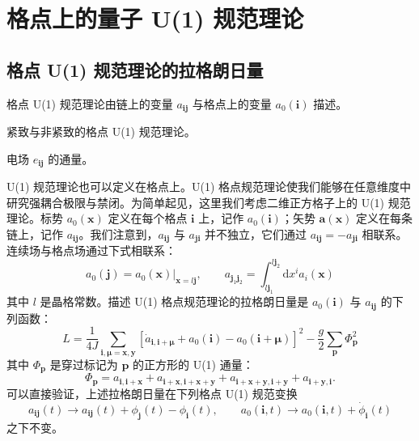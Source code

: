 \section{格点上的量子 U(1) 规范理论}

\subsection{格点 U(1) 规范理论的拉格朗日量}

\begin{keypoints}
\item 格点 U(1) 规范理论由链上的变量 $a_{\pmb{i}\pmb{j}}$ 与格点上的变量 $a_{0}(\pmb{i})$ 描述。
\item 紧致与非紧致的格点 U(1) 规范理论。
\item 电场 $e_{\pmb{i}\pmb{j}}$ 的通量。
\end{keypoints}

U(1) 规范理论也可以定义在格点上。U(1) 格点规范理论使我们能够在任意维度中研究强耦合极限与禁闭。为简单起见，这里我们考虑二维正方格子上的 U(1) 规范理论。标势 $a_{0}(\pmb{x})$ 定义在每个格点 $\pmb{i}$ 上，记作 $a_{0}(\pmb{i})$；矢势 $\pmb{a}(\pmb{x})$ 定义在每条链上，记作 $a_{\pmb{i}\pmb{j}}$。我们注意到，$a_{\pmb{i}\pmb{j}}$ 与 $a_{\pmb{j}\pmb{i}}$ 并不独立，它们通过 $a_{\pmb{i}\pmb{j}}=-a_{\pmb{j}\pmb{i}}$ 相联系。连续场与格点场通过下式相联系：
\begin{equation*}
a_{0}(\pmb{j})=a_{0}(\pmb{x})|_{\pmb{x}=l\pmb{j}}, \qquad a_{\pmb{j}_{1}\pmb{j}_{2}}=\int_{l\pmb{j}_{1}}^{l\pmb{j}_{2}}\mathrm{d}x^{i}a_{i}(\pmb{x}) \tag{6.4.1}
\end{equation*}
其中 $l$ 是晶格常数。描述 U(1) 格点规范理论的拉格朗日量是 $a_{0}(\pmb{i})$ 与 $a_{\pmb{i}\pmb{j}}$ 的下列函数：
\begin{equation*}
L=\frac{1}{4J}\sum_{\pmb{i},\pmb{\mu}=\pmb{x},\pmb{y}}\left[\dot{a}_{\pmb{i},\pmb{i}+\pmb{\mu}}+a_{0}(\pmb{i})-a_{0}(\pmb{i}+\pmb{\mu})\right]^{2}-\frac{g}{2}\sum_{\pmb{p}}\Phi_{\pmb{p}}^{2} \tag{6.4.2}
\end{equation*}
其中 $\Phi_{\pmb{p}}$ 是穿过标记为 $\pmb{p}$ 的正方形的 U(1) 通量：
\begin{equation*}
\Phi_{\pmb{p}}=a_{\pmb{i},\pmb{i}+\pmb{x}}+a_{\pmb{i}+\pmb{x},\pmb{i}+\pmb{x}+\pmb{y}}+a_{\pmb{i}+\pmb{x}+\pmb{y},\pmb{i}+\pmb{y}}+a_{\pmb{i}+\pmb{y},\pmb{i}}. \tag{6.4.3}
\end{equation*}
可以直接验证，上述拉格朗日量在下列格点 U(1) 规范变换
\begin{equation*}
a_{\pmb{i}\pmb{j}}(t)\rightarrow a_{\pmb{i}\pmb{j}}(t)+\phi_{\pmb{j}}(t)-\phi_{\pmb{i}}(t), \qquad a_{0}(\pmb{i},t)\rightarrow a_{0}(\pmb{i},t)+\dot{\phi}_{\pmb{i}}(t) \tag{6.4.4}
\end{equation*}
之下不变。

